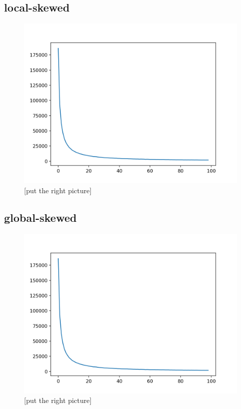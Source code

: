 \subsection{local-skewed}\label{sec:local-skewed}
\begin{figure}[htb]
  \centering
  \includegraphics[width=\textwidth,height=\textheight,keepaspectratio]{img/skew-alpha1.png}
  \caption[The architecture of the system]{ [put the right picture] }
  \label{fig:b+tree}
\end{figure}
\newpage
\subsection{global-skewed}\label{sec:global-skewed}
\begin{figure}[htb]
  \centering
  \includegraphics[width=\textwidth,height=\textheight,keepaspectratio]{img/skew-alpha1.png}
  \caption[The architecture of the system]{ [put the right picture] }
  \label{fig:b+tree}
\end{figure}
\newpage
